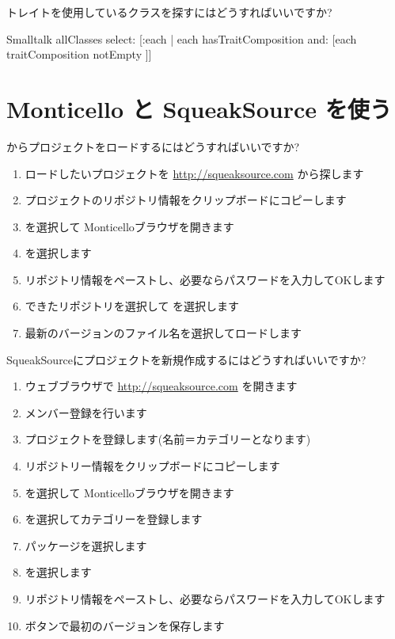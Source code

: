 \documentclass[a4paper,10pt,twoside]{book}
\begin{document}
\begin{faq}
トレイトを使用しているクラスを探すにはどうすればいいですか?
\end{faq}
\answer
\begin{code}{}
Smalltalk allClasses select: [:each | each hasTraitComposition and: [each traitComposition notEmpty ]]
\end{code}

\section{Monticello と SqueakSource を使う}

\begin{faq}
 からプロジェクトをロードするにはどうすればいいですか?
\end{faq}
\answer
\begin{enumerate}
  \item ロードしたいプロジェクトを \url{http://squeaksource.com} から探します
  \item プロジェクトのリポジトリ情報をクリップボードにコピーします
  \item {} を選択して Monticelloブラウザを開きます
  \item {} を選択します
  \item リポジトリ情報をペーストし、必要ならパスワードを入力してOKします
  \item できたリポジトリを選択して  を選択します
  \item 最新のバージョンのファイル名を選択してロードします
\end{enumerate}

\begin{faq}
SqueakSourceにプロジェクトを新規作成するにはどうすればいいですか?
\end{faq}
\answer
\begin{enumerate}
  \item ウェブブラウザで \url{http://squeaksource.com} を開きます
  \item メンバー登録を行います
  \item プロジェクトを登録します(名前＝カテゴリーとなります)
  \item リポジトリー情報をクリップボードにコピーします
  \item {} を選択して Monticelloブラウザを開きます
  \item {} を選択してカテゴリーを登録します
  \item パッケージを選択します
  \item {} を選択します
  \item リポジトリ情報をペーストし、必要ならパスワードを入力してOKします
  \item {}ボタンで最初のバージョンを保存します
\end{enumerate}
\end{document}
